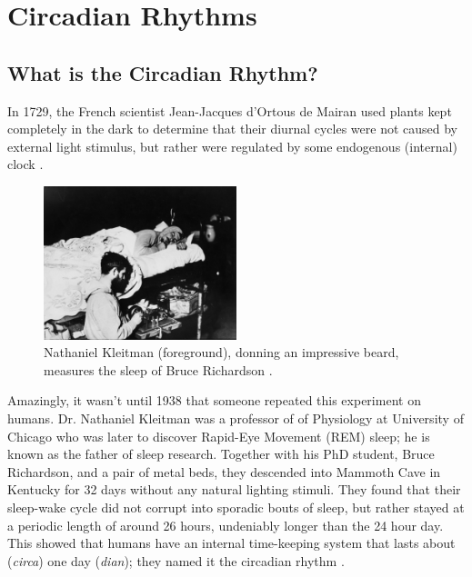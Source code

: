 \section{Circadian Rhythms}
\label{sec:Circadian}

\subsection{What is the Circadian Rhythm?}

In 1729, the French scientist Jean-Jacques d'Ortous de Mairan	used plants kept completely in the dark to determine that their diurnal cycles were not caused by external light stimulus, but rather were regulated by some endogenous (internal) clock \citep{demairanObservationBotanique1729}. 

\begin{figure}
	\includegraphics[width=0.5\textwidth]{Images/KleitmanCave}
	\caption{Nathaniel Kleitman (foreground), donning an impressive beard, measures the sleep of  Bruce Richardson \citep{universityofchicagophotographicarchiveKleitmanNathanielPhotographic}.}
	\label{Fig:Cave}
\end{figure}

Amazingly, it wasn't until 1938 that someone repeated this experiment on humans. Dr. Nathaniel Kleitman was a professor of of Physiology at University of Chicago who was later to discover Rapid-Eye Movement (REM) sleep; he is known as the father of sleep research. Together with his PhD student, Bruce Richardson, and a pair of metal beds, they descended into Mammoth Cave in Kentucky for 32 days without any natural lighting stimuli. They found that their sleep-wake cycle did not corrupt into sporadic bouts of sleep, but rather stayed at a periodic length of around 26 hours, undeniably longer than the 24 hour day. This showed that humans have an internal time-keeping system that lasts about (\textit{circa}) one day (\textit{dian}); they named it the circadian rhythm \citep{kleitmanSleepWakefulness1987}.

